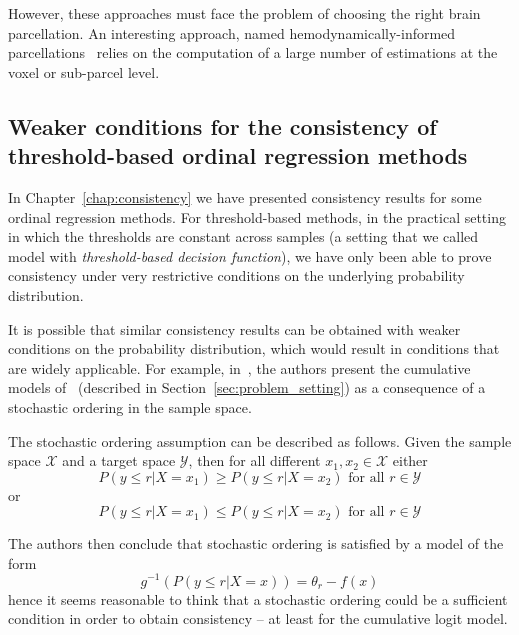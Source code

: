 However, these approaches must face the problem of choosing the right brain parcellation. 
An interesting approach, named
\mbox{hemodynamically-informed}
parcellations~\citep{Chaari2012,Badillo2013a} relies on the computation of 
a large number of estimations at the voxel or \mbox{sub-parcel} level.







\subsection{Weaker conditions for the consistency of threshold-based ordinal regression methods}

In Chapter~\ref{chap:consistency} we have presented consistency results for some ordinal regression methods. For threshold-based methods, in the practical setting in which the thresholds are constant across samples (a setting that we called model with \emph{threshold-based decision function}), we have only been able to prove consistency under very restrictive conditions on the underlying probability distribution.

It is possible that similar consistency results can be obtained with weaker conditions on the probability distribution, which would result in conditions that are widely applicable. For example, in~\citep[Section 2]{Herbrich1999}, the authors present the cumulative models of~\citep{McCullagh1980} (described in Section~\ref{sec:problem_setting}) as a consequence of a stochastic ordering in the sample space. 

The stochastic ordering assumption can be described as follows. Given the sample space $\mathcal{X}$ and a target space $\mathcal{Y}$, then for all different $x_1, x_2 \in \mathcal{X}$ either
$$
P(y \leq r | X=x_1) \geq P(y \leq r | X=x_2) \text{ for all } r \in \mathcal{Y}
$$
or
$$
P(y \leq r | X=x_1) \leq P(y \leq r | X=x_2) \text{ for all } r \in \mathcal{Y}
$$

The authors then conclude that stochastic ordering is satisfied by a model of the form
$$
g^{-1}(P(y \leq r|X=x)) = \theta_r - f(x)
$$
hence it seems reasonable to think that a stochastic ordering could be a sufficient condition in order to obtain consistency -- at least for the cumulative logit model. 


